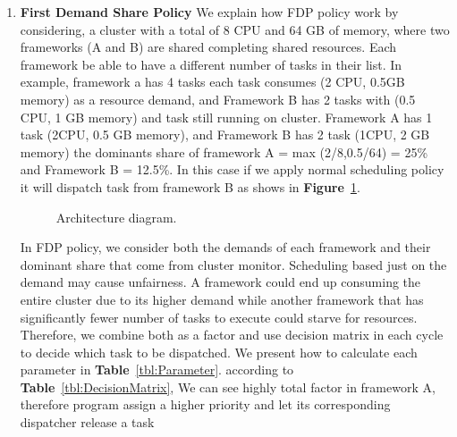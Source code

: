 \documentclass[12pt,oneside,openright,a4paper]{cpe-english-project}
\begin{document}
\begin{enumerate}
  \item \textbf{First Demand Share Policy} We explain how FDP policy work by considering, a cluster with a total of 8 CPU and 64 GB of memory, where two frameworks (A and B) are shared completing shared resources. Each framework be able to have a different number of tasks in their list. In example, framework a has 4 tasks each task consumes (2 CPU, 0.5GB memory) as a resource demand, and Framework B has 2 tasks with (0.5 CPU, 1 GB memory) and task still running on cluster. Framework A has 1 task (2CPU, 0.5 GB memory), and Framework B has 2 task (1CPU, 2 GB memory) the dominants share of framework A = max (2/8,0.5/64) = 25\% and Framework B = 12.5\%. In this case if we apply normal scheduling policy it will dispatch task from framework B as shows in \textbf{Figure}~\ref{fig:flowDiagram}.
  
\begin{figure}[!h]\centering
\setlength{\fboxrule}{0mm} %
\setlength{\fboxsep}{0cm}
\caption{Architecture diagram.}\label{fig:flowDiagram}
\end{figure}

In FDP policy, we consider both the demands of each framework and their dominant share that come from cluster monitor. Scheduling based just on the demand may cause unfairness. A framework could end up consuming the entire cluster due to its higher demand while another framework that has significantly fewer number of tasks to execute could starve for resources. Therefore, we combine both as a factor and use decision matrix in each cycle to decide which task to be dispatched. We present how to calculate each parameter in \textbf{Table}~\ref{tbl:Parameter}. according to \textbf{Table}~\ref{tbl:DecisionMatrix}, We can see highly total factor in framework A, therefore program assign a higher priority and let its corresponding dispatcher release a task


\end{enumerate}
\end{document}
